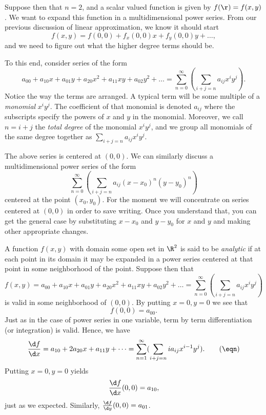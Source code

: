 Suppose then that $n = 2$, and a scalar valued function is given
by $f(\r) = f(x,y)$.  We want to expand this function in a
multidimensional power series.   From our previous discussion
of linear approximation, we know it should start
$$
f(x,y) = f(0,0) + f_x(0,0)x + f_y(0,0)y + \dots,
$$
and we need to figure out what the higher degree terms should be.

To this end, 
consider series of the
 form
$$
a_{00} + a_{10}x + a_{01}y + a_{20}x^2 + a_{11}xy + a_{02}y^2
 + \dots = \sum_{n=0}^\infty(\sum_{i+j = n} a_{ij}x^iy^j).
$$
Notice the way the terms are arranged.  A typical term will
be some multiple of a {\it monomial\/} $x^iy^j$.   The coefficient
of that monomial is denoted $a_{ij}$ where the subscripts specify the
powers of $x$ and $y$ in the monomial.   Moreover, we call 
$n = i+j$ the {\it total degree\/} of the monomial $x^iy^j$, and 
we group all monomials of the same degree together as
$\sum_{i+j = n} a_{ij}x^iy^j$.

The above series is centered at $(0,0)$.  We can similarly
discuss a multidimensional power series of the form
$$
    \sum_{n=0}^\infty (\sum_{i+j = n} a_{ij}(x - x_0)^n(y - y_0)^n)
$$
centered at the point $(x_0,y_0)$.   For the moment we will
concentrate on series centered at $(0,0)$ in order to save writing.
Once you understand that, you can get the general case by
substituting $x - x_0$ and $y - y_0$ for $x$ and $y$ and making
other appropriate changes.

A function $f(x,y)$ with domain some open set in $\R^2$
is said to be {\it analytic\/} if at each point in its domain
it may be expanded in a power series centered at that point
in some neighborhood of the point.   Suppose then that
$$
f(x,y) =  
a_{00} + a_{10}x + a_{01}y + a_{20}x^2 + a_{11}xy + a_{02}y^2
 + \dots = \sum_{n=0}^\infty(\sum_{i+j = n} a_{ij}x^iy^j)
$$
is valid in some neighborhood of $(0,0)$.  By putting $x = 0, y = 0$
we see that 
$$f(0,0) = a_{00}.$$
  Just as in the case
of power series in one variable, term by term differentiation
(or integration) is valid.   Hence, we have
\nexteqn
\xdef\EqOne{\eqn}
$$
\frac{\d f}{\d x} = a_{10} + 2a_{20}x + a_{11}y + \dots
   = \sum_{n=1}^\infty (\sum_{i + j = n} ia_{ij}x^{i-1}y^j).\tag\eqn
$$
Putting $x = 0, y = 0$ yields
$$
\frac{\d f}{\d x}(0,0) = a_{10},
$$
just as we expected.  Similarly,  $\frac{\d f}{\d y}(0,0) = a_{01}$.

